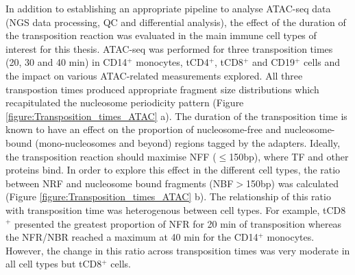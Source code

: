 In addition to establishing an appropriate pipeline to analyse ATAC-seq data (NGS data processing, QC and differential analysis), the effect of the duration of the transposition reaction was evaluated in the main immune cell types of interest for this thesis. ATAC-seq was performed for three transposition times (20, 30 and 40 min) in CD14$^+$ monocytes, tCD4$^+$, tCD8$^+$ and CD19$^+$ cells and the impact on various ATAC-related measurements explored. All three transpostion times produced appropriate fragment size distributions which recapitulated the nucleosome periodicity pattern (Figure \ref{figure:Transposition_times_ATAC} a). The duration of the transposition time is known to have an effect on the proportion of nucleosome-free and nucleosome-bound (mono-nucleosomes and beyond) regions tagged by the adapters. Ideally, the transposition reaction should maximise NFF ($\leq$150bp), where TF and other proteins bind. In order to explore this effect in the different cell types, the ratio between NRF and nucleosome bound fragments (NBF$>$150bp) was calculated (Figure \ref{figure:Transposition_times_ATAC} b). The relationship of this ratio with transposition time was heterogenous between cell types. For example, tCD8$^+$ presented the greatest proportion of NFR for 20 min of transposition whereas the NFR/NBR reached a maximum at 40 min for the CD14$^+$ monocytes. However, the change in this ratio across transposition times was very moderate in all cell types but tCD8$^+$ cells. 


